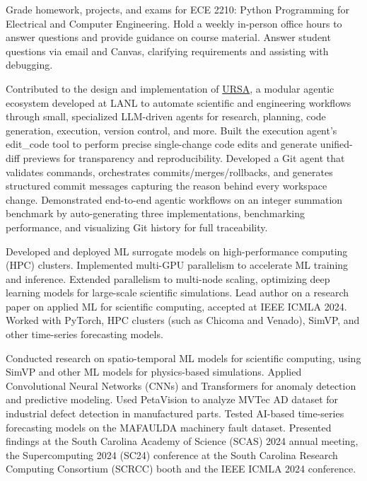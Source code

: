 \documentclass{resume}
\begin{document}
\begin{rExperience}



{Grade homework, projects, and exams for ECE 2210: Python Programming for Electrical and Computer Engineering.}
{Hold a weekly in-person office hours to answer questions and provide guidance on course material.}
{Answer student questions via email and Canvas, clarifying requirements and assisting with debugging.}
{}
{}


{Contributed to the design and implementation of \href{https://github.com/lanl/ursa}{URSA}, a modular agentic ecosystem developed at LANL to automate scientific and engineering workflows through small, specialized LLM-driven agents for research, planning, code generation, execution, version control, and more.}
{Built the execution agent's edit\_code tool to perform precise single-change code edits and generate unified-diff previews for transparency and reproducibility.}
{Developed a Git agent that validates commands, orchestrates commits/merges/rollbacks, and generates structured commit messages capturing the reason behind every workspace change.}
{Demonstrated end-to-end agentic workflows on an integer summation benchmark by auto-generating three implementations, benchmarking performance, and visualizing Git history for full traceability.}
{}

{Developed and deployed ML surrogate models on high-performance computing (HPC) clusters.}
{Implemented multi-GPU parallelism to accelerate ML training and inference.}
{Extended parallelism to multi-node scaling, optimizing deep learning models for large-scale scientific simulations.}
{Lead author on a research paper on applied ML for scientific computing, accepted at IEEE ICMLA 2024.}
{Worked with PyTorch, HPC clusters (such as Chicoma and Venado), SimVP, and other time-series forecasting models.}


{Conducted research on spatio-temporal ML models for scientific computing, using SimVP and other ML models for physics-based simulations.}
{Applied Convolutional Neural Networks (CNNs) and Transformers for anomaly detection and predictive modeling.}
{Used PetaVision to analyze MVTec AD dataset for industrial defect detection in manufactured parts.}
{Tested AI-based time-series forecasting models on the MAFAULDA machinery fault dataset.}
{Presented findings at the South Carolina Academy of Science (SCAS) 2024 annual meeting, the Supercomputing 2024 (SC24) conference at the South Carolina Research Computing Consortium (SCRCC) booth and the IEEE ICMLA 2024 conference.}


\end{rExperience}
\end{document}
